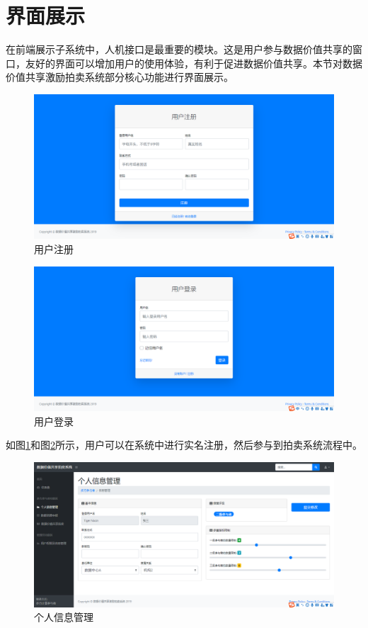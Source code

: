 \documentclass[promaster]{thesis-uestc}
\begin{document}
\FloatBarrier

\section{界面展示}

在前端展示子系统中，人机接口是最重要的模块。这是用户参与数据价值共享的窗口，友好的界面可以增加用户的使用体验，有利于促进数据价值共享。本节对数据价值共享激励拍卖系统部分核心功能进行界面展示。

\begin{figure}[H]
    \includegraphics[width=400pt]{ui/register.png}
    \caption{用户注册}
    \label{register}
\end{figure}

\begin{figure}[H]
    \includegraphics[width=400pt]{ui/login.png}
    \caption{用户登录}
    \label{login}
\end{figure}

如图\ref{register}和图\ref{login}所示，用户可以在系统中进行实名注册，然后参与到拍卖系统流程中。

\begin{figure}[H]
    \includegraphics[width=400pt]{ui/gerenxinxiguanli.png}
    \caption{个人信息管理}
    \label{gerenxinxi}
\end{figure}
\end{document}
